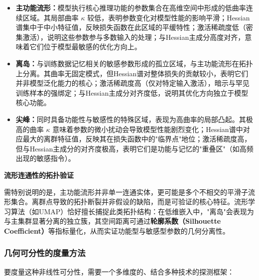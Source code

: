\documentclass[letterpaper,twocolumn,10pt]{article}
\begin{document}
\begin{itemize}
\item \textbf{主功能流形：}模型执行核心推理功能的参数集合在高维空间中形成的低曲率连续区域。其局部曲率 $\kappa$ 较低，表明参数变化对模型性能的影响平滑；Hessian谱集中于中小特征值，反映损失函数在此区域的平缓特性；激活稀疏度低（密集激活），说明这些参数参与多数输入的处理；与Hessian主成分高度对齐，意味着它们位于模型最敏感的优化方向上。

\item \textbf{离岛：}与训练数据记忆相关的敏感参数形成的孤立区域，与主功能流形在拓扑上分离。其曲率无固定模式，但Hessian谱对整体损失的贡献较小，表明它们并非模型泛化能力的核心；激活稀疏度高（仅对特定输入激活），暗示与罕见训练样本的强绑定；与Hessian主成分对齐度低，说明其优化方向独立于模型核心功能。

\item \textbf{尖峰：}同时具备功能性与敏感性的特殊区域，表现为高曲率的局部凸起。其极高的曲率 $\kappa$ 意味着参数的微小扰动会导致模型性能剧烈变化；Hessian谱中对应最大的离群特征值，反映其在损失函数中的"临界点"地位；激活稀疏度高，但与Hessian主成分的对齐度极高，表明它们是功能与记忆的"重叠区"（如高频出现的敏感指令）。
\end{itemize}

\textbf{流形连通性的拓扑验证}

需特别说明的是，主功能流形并非单一连通实体，更可能是多个不相交的平滑子流形集合。离群点导致的拓扑断裂并非假设的缺陷，而是可验证的核心特征。流形学习算法（如UMAP）恰好擅长捕捉此类拓扑结构：在低维嵌入中，"离岛"会表现为与主集群显著分离的独立簇，其空间距离可通过\textbf{轮廓系数（Silhouette Coefficient）}等指标量化，从而实证功能型与敏感型参数的几何分离性。

\subsubsection{几何可分性的度量方法}

要度量这种非线性可分性，需要一个多维度的、结合多种技术的探测框架：
\end{document}
